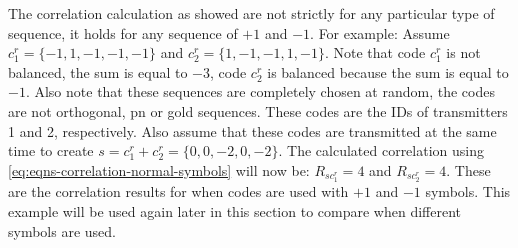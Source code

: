 %


The correlation calculation as showed are not strictly for any particular type of sequence, it holds for any sequence of $+1$ and $-1$.
For example: Assume $c^r_1 = \{ -1, 1, -1, -1, -1 \}$ and $c^r_2 = \{ 1, -1, -1, 1, -1 \}$.
Note that code $c^r_1$ is not balanced, the sum is equal to $-3$, code $c^r_2$ is balanced because the sum is equal to $-1$.
Also note that these sequences are completely chosen at random, the codes are not orthogonal, pn or gold sequences.
These codes are the IDs of transmitters 1 and 2, respectively.
Also assume that these codes are transmitted at the same time to create $s = c^r_1 + c^r_2 = \{ 0, 0, -2, 0, -2 \}$.
The calculated correlation using \autoref{eq:eqns-correlation-normal-symbols} will now be: $R_{sc^r_{1}} = 4$ and $R_{sc^r_{2}} = 4$.
These are the correlation results for when codes are used with $+1$ and $-1$ symbols.
This example will be used again later in this section to compare when different symbols are used.


